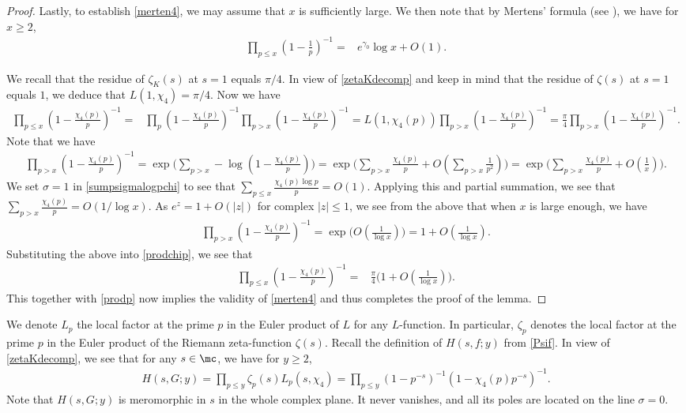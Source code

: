 \documentclass[twoside,leqno,10pt, A4]{amsart}
\begin{document}
\begin{proof}
  Lastly, to establish \eqref{merten4}, we may assume that $x$ is sufficiently large. We then note that by Mertens' formula (see \cite[Theorem 2.7 (e)]{MVa1}), we have for $x \geq 2$, 
\begin{align}
\label{prodp}
\prod_{p\le x} (1-\frac {1}{p})^{-1}=& e^{\gamma_0}\log x + O(1).
\end{align}  

   We recall that the residue of $\zeta_K(s)$ at $s=1$ equals $\pi/4$. In view of \eqref{zetaKdecomp} and keep in mind that the residue of $\zeta(s)$ at $s=1$ equals $1$, we deduce that $L(1, \chi_4)=\pi/4$. Now we have
\begin{align}
\label{prodchip}
\prod_{p\le x} (1-\frac {\chi_4(p)}{p})^{-1}=& \prod_{p} (1-\frac {\chi_4(p)}{p})^{-1}\prod_{p> x} (1-\frac {\chi_4(p)}{p})^{-1}=L(1, \chi_4(p))\prod_{p> x} (1-\frac {\chi_4(p)}{p})^{-1}=\frac {\pi}{4}\prod_{p> x} (1-\frac {\chi_4(p)}{p})^{-1}.
\end{align}   
  Note that we have
\begin{align*}
\prod_{p> x} (1-\frac {\chi_4(p)}{p})^{-1}=\exp \Big (\sum_{p>x}-\log (1-\frac {\chi_4(p)}{p} )\Big )=\exp \Big (\sum_{p>x}\frac {\chi_4(p)}{p}+O(\sum_{p>x}\frac 1{p^2})\Big )=\exp \Big (\sum_{p>x}\frac {\chi_4(p)}{p}+O(\frac 1{x})\Big ).
\end{align*}     
 We set $\sigma=1$ in \eqref{sumpsigmalogpchi} to see that $\sum_{p\le x} \frac{\chi_4(p)\log p}{p} = O(1)$. Applying this and partial summation, we see that
 $\sum_{p>x}\frac {\chi_4(p)}{p}=O(1/\log x)$. As $e^z=1+O(|z|)$ for complex $|z| \leq 1$, we see from the above that when $x$ is large enough, we have
\begin{align*}
\prod_{p> x} (1-\frac {\chi_4(p)}{p})^{-1}=\exp \Big (O(\frac 1{\log x})\Big )=1+O(\frac 1{\log x}).
\end{align*} 
  Substituting the above into \eqref{prodchip}, we see that
\begin{align*}
\prod_{p\le x} (1-\frac {\chi_4(p)}{p})^{-1}=& \frac {\pi}{4}\big(1+O(\frac 1{\log x})\big).
\end{align*}        
  This together with \eqref{prodp} now implies the validity of \eqref{merten4} and thus completes the proof of the lemma. 
\end{proof}


  
   We denote $L_p$ the local factor at the prime $p$ in the Euler product of $L$ for any $L$-function. In particular, $\zeta_p$ denotes the local factor at the prime $p$ in the Euler product of the Riemann zeta-function $\zeta(s)$. Recall the definition of $H(s,f;y)$ from \eqref{Psif}. In view of \eqref{zetaKdecomp}, we see that for any $s \in \mc$, we have for $y \geq 2$, 
\begin{align}
\label{Lsf}
  H(s,G;y)=\prod_{p \leq y}\zeta_p(s)L_p(s, \chi_4)= \prod_{p \leq y}(1-p^{-s})^{-1}(1-\chi_4(p)p^{-s})^{-1}. 
\end{align}
  Note that $H(s,G;y)$ is meromorphic in $s$ in the whole complex plane. It never vanishes, and all its poles are located on the line $\sigma=0$. 
\end{document}
